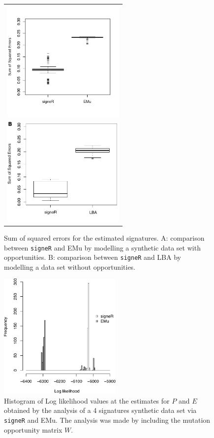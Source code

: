 \documentclass{bioinfo}
\begin{document}
\begin{figure}  
 \centering
   \begin{tabular}{c}
 \includegraphics[width=6cm]{figs/Simulation_signeR_vs_EMu_boxplot_SSE}
   \\
 \includegraphics[width=6cm]{figs/Simulation_signeR_vs_Alex_boxplot_SSE_P}
   \end{tabular}
  \caption{\textrm{%
    Sum of squared errors for the estimated signatures. A:
    comparison between \texttt{signeR} and EMu by modelling a synthetic
    data set with opportunities. B: comparison between \texttt{signeR}
    and LBA by modelling a data set without opportunities.
   }
  }
  \label{fig:synth_SSE}
\end{figure}
\begin{figure}  
 \centering
  \includegraphics[width=6cm]{figs/Simulation_signeR_vs_EMu_histogram_LLh_same_axis_500sim} 
  \caption{\textrm{%
   Histogram of Log likelihood values at the estimates for $P$ and $E$
   obtained by the analysis of a 4 signatures synthetic data set via
   \texttt{signeR} and EMu. The analysis was made by including the
   mutation opportunity matrix $W$.
   }
  }
  \label{fig:synth_LLh}
\end{figure}
\end{document}
